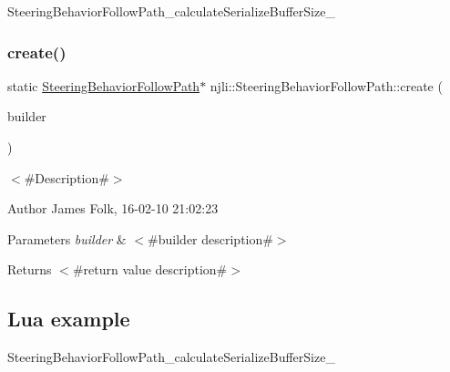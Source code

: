 \begin{DoxyCodeInclude}
\end{DoxyCodeInclude}
Steering\+Behavior\+Follow\+Path\+\_\+calculate\+Serialize\+Buffer\+Size\+\_\+ \mbox{\label{classnjli_1_1_steering_behavior_follow_path_ab971d2cd578ee87af6e863369fd4efa8}} 
\subsubsection{\texorpdfstring{create()}{create()}\hspace{0.1cm}{\footnotesize\ttfamily [2/2]}}
{\footnotesize\ttfamily static \mbox{\hyperlink{classnjli_1_1_steering_behavior_follow_path}{Steering\+Behavior\+Follow\+Path}}$\ast$ njli\+::\+Steering\+Behavior\+Follow\+Path\+::create (\begin{DoxyParamCaption}\item[{const \mbox{\hyperlink{classnjli_1_1_steering_behavior_follow_path_builder}{Steering\+Behavior\+Follow\+Path\+Builder}} \&}]{builder }\end{DoxyParamCaption})\hspace{0.3cm}{\ttfamily [static]}}



$<$\#\+Description\#$>$ 

\begin{DoxyAuthor}{Author}
James Folk, 16-\/02-\/10 21\+:02\+:23
\end{DoxyAuthor}

\begin{DoxyParams}{Parameters}
{\em builder} & $<$\#builder description\#$>$\\
\hline
\end{DoxyParams}
\begin{DoxyReturn}{Returns}
$<$\#return value description\#$>$
\end{DoxyReturn}
\hypertarget{classnjli_1_1_steering_behavior_wander_ex1}{}\subsection{Lua example}\label{classnjli_1_1_steering_behavior_wander_ex1}

\begin{DoxyCodeInclude}
\end{DoxyCodeInclude}
Steering\+Behavior\+Follow\+Path\+\_\+calculate\+Serialize\+Buffer\+Size\+\_\+ \mbox{\label{classnjli_1_1_steering_behavior_follow_path_ab66eee2d77b84ff0bd458b2152c36ebf}} 
